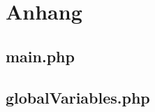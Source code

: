 \section{Anhang}

\subsection{main.php}



\subsection{globalVariables.php}



\begin{comment}

\begin{lstlisting}
<?php
ini_set('memory_limit', '1024M');

// General Functions



function startMessage() {


	global $simulationStartTimeToday;
	global $simulationEndTimeToday;
	global $simulationDuration;
	global $realStartTime;
	global $realEndTime;
	global $cacheFahrplanSession;

	$realStartTimeAsHHMMSS = getUhrzeit($realStartTime, "simulationszeit", null, array("outputtyp"=>"h:i:s"));
	$simulationEndTimeAsHHMMSS = getUhrzeit($simulationEndTimeToday, "simulationszeit", null, array("outputtyp"=>"h:i:s"));
	$simulationDurationAsHHMMSS = toStd($simulationDuration);
	$realEndTimeAsHHMMSS = getUhrzeit($realEndTime, "simulationszeit", null, array("outputtyp"=>"h:i:s"));
	$simulationStartTimeAsHHMMSS = getUhrzeit($simulationStartTimeToday, "simulationszeit", null, array("outputtyp"=>"h:i:s"));

	$hashtagLine = "#####################################################################\n";
	$emptyLine = "#\t\t\t\t\t\t\t\t\t\t\t\t\t\t\t\t\t#\n";


\end{comment}

